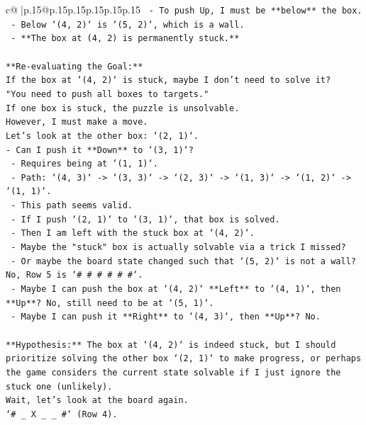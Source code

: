 \documentclass{article}
\begin{document}
{\begin{supertabular}{c@{$\;$}|p{.15\linewidth}@{}p{.15\linewidth}p{.15\linewidth}p{.15\linewidth}p{.15\linewidth}p{.15\linewidth}}
{{{\texttt{            {-}   To push Up, I must be **below** the box.} \\
\texttt{            {-}   Below `(4, 2)` is `(5, 2)`, which is a wall.} \\
\texttt{            {-}   **The box at (4, 2) is permanently stuck.**} \\
\\ 
\texttt{**Re{-}evaluating the Goal:**} \\
\texttt{If the box at `(4, 2)` is stuck, maybe I don't need to solve it?} \\
\texttt{"You need to push all boxes to targets."} \\
\texttt{If one box is stuck, the puzzle is unsolvable.} \\
\texttt{However, I must make a move.} \\
\texttt{Let's look at the other box: `(2, 1)`.} \\
\texttt{{-}   Can I push it **Down** to `(3, 1)`?} \\
\texttt{    {-}   Requires being at `(1, 1)`.} \\
\texttt{    {-}   Path: `(4, 3)` {-}> `(3, 3)` {-}> `(2, 3)` {-}> `(1, 3)` {-}> `(1, 2)` {-}> `(1, 1)`.} \\
\texttt{    {-}   This path seems valid.} \\
\texttt{    {-}   If I push `(2, 1)` to `(3, 1)`, that box is solved.} \\
\texttt{    {-}   Then I am left with the stuck box at `(4, 2)`.} \\
\texttt{    {-}   Maybe the "stuck" box is actually solvable via a trick I missed?} \\
\texttt{    {-}   Or maybe the board state changed such that `(5, 2)` is not a wall? No, Row 5 is `\# \# \# \# \# \#`.} \\
\texttt{    {-}   Maybe I can push the box at `(4, 2)` **Left** to `(4, 1)`, then **Up**? No, still need to be at `(5, 1)`.} \\
\texttt{    {-}   Maybe I can push it **Right** to `(4, 3)`, then **Up**? No.} \\
\\ 
\texttt{**Hypothesis:** The box at `(4, 2)` is indeed stuck, but I should prioritize solving the other box `(2, 1)` to make progress, or perhaps the game considers the current state solvable if I just ignore the stuck one (unlikely).} \\
\texttt{Wait, let's look at the board again.} \\
\texttt{`\# \_ X \_ \_ \#` (Row 4).} \\
}}}
\end{supertabular}}
\end{document}
